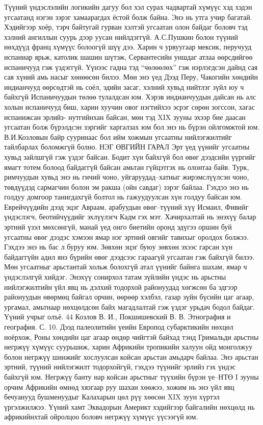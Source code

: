 Түүний үндэслэлийн логикийн дагуу бол хэл сурах чадвартай хүмүүс хэд хэдэн угсаатанд нэгэн зэрэг хамаарагдах ёстой болж байна. Энэ нь утга учир багатай. Хэдийгээр хоёр, тэрч байтугай гурван хэлтэй угсаатан олон байдаг боловч тэд хэлний ангиллын суурь дээр уусан нийлдэггүй. А.С.Пушкин болон түүний нөхдүүд франц хүмүүс болоогүй шүү дээ. Харин ч урвуугаар мексик, перучууд испаниар ярьж, католик шашин шүтэж, Сервантесийн уншдаг атлаа өөрсдийгөө испаничууд гэж үздэггүй. Үүнээс гадна тэд “чөлөөлөх” гэж нэрлэгдсэн дайнд сая сая хүний амь насыг хөнөөсөн билээ. Мөн энэ үед Дээд Перу, Чакогийн хөндийн индианчууд өөрсөдтэй нь соёл, эдийн засаг, хэлний хувьд нийтлэг зүйл юу ч байхгүй Испаничуудын төлөө тулалдсан юм. Хэрэв индианчуудын дайсан нь алс холын испаничууд биш, харин хуучин овог нэгтийхээ эсрэг сөрөн зогссон, хагас испанижсан эрлийз- нутгийнхан байсан, мөн тэд XIX зууны эхээр бие даасан угсаатан болж бүрэлдсэн зэргийг харгалзах юм бол энэ нь бүрэн ойлгомжтой юм. В.И.Козловын байр сууринаас бол ийм хожмын угсаатны нийлэгжилтийг тайлбарлах боломжгүй болно.
НЭГ ӨВГИЙН ГАРАЛ
Эрт үед үүнийг угсаатны хувьд зайлшгүй гэж үздэг байсан. Бодит хүн байхгүй бол өвөг дээдсийн үүргийг ямагт тотем болоод байдаггүй байсан амьтан гүйцэтгэх нь олонтаа байв. Турк, римчуудын хувьд энэ нь гичий чоно, уйгаруудад–хатныг жирэмслүүлсэн чоно, төвдүүдэд сармагчин болон эм ракша (ойн савдаг) зэрэг байлаа. Гэхдээ энэ нь голдуу домгоор танигдахгүй болтол нь гажуудуулсан хүн голдуу байсан юм. Еврейчүүдийн дээд эцэг Авраам, арабуудын өвөг–түүний хүү Исмаил, Фивийг үндэслэгч, беотийчүүдийг эхлүүлэгч Кадм гэх мэт.
Хачирхалтай нь энэхүү балар эртний үзэл мөхсөнгүй, манай үед онго биетийн оронд эдүгээ оршин буй угсаатны өвөг дээдэс хэмээн ямар нэг эртний овгийг тавихыг оролдох болжээ. Гэхдээ энэ нь бас л буруу юм. Зөвхөн эцэг буюу зөвхөн эхээс гарсан хүн байдаггүйн адил янз бүрийн өвөг дээдсээс гараагүй угсаатан гэж байхгүй билээ. Мөн угсаатныг арьстантай хольж болохгүй атал үүнийг байнга шахам, ямар ч үндэслэлгүй хийдэг. Энэхүү сонирхол татам зүйлийн үндэс нь арьстны нийлэгжилтийн үйл явц нь дэлхий тодорхой районуудад хөгжсөн ба эдгээр районуудын өвөрмөц байгал орчин, өөрөөр хэлбэл, газар зүйн бүсийн цаг агаар, ургамал, амьтнаар нөхцөлдсөн байх магадлалтай гэж үздэг урьдач бодол байдаг. Үүний учрыг олъё.
44 Козлов В. И., Покшишевский В. В. Этнография и география. С. 10.
Дээд палеолитийн үеийн Европод субарктикийн нөхцөл ноёрхож, Роны хөндийн цаг агаар өндөр чийгтэй байхад тэнд Гримальди арьстны негржүү хүмүүс суурьшиж, харин Африкийн тропикийн халуун ойд монголжуу болон негржүү шинжийг хослуулсан койсан арьстан амьдарч байлаа. Энэ арьстан эртний, түүний нийлэгжилт тодорхойгүй, гэхдээ түүнийг эрлийз гэх үндэс байхгүй юм. Негржүү банту нар койсан арьстныг түүхийн бүрэн үе–НТӨ I зууны орчим Африкийн өмнөд хязгаар руу шахан хөөжээ, хожим нь энэ үйл явц бечуанууд бушменуудыг Калахарын цөл рүү хөөсөн XIX зуун хүртэл үргэлжилжээ. Үүний хамт Эквадорын Америкт хэдийгээр байгалийн нөхцөлд нь африкийнхтай ойролцоо боловч негржүү хүмүүс үүсээгүй юм.
